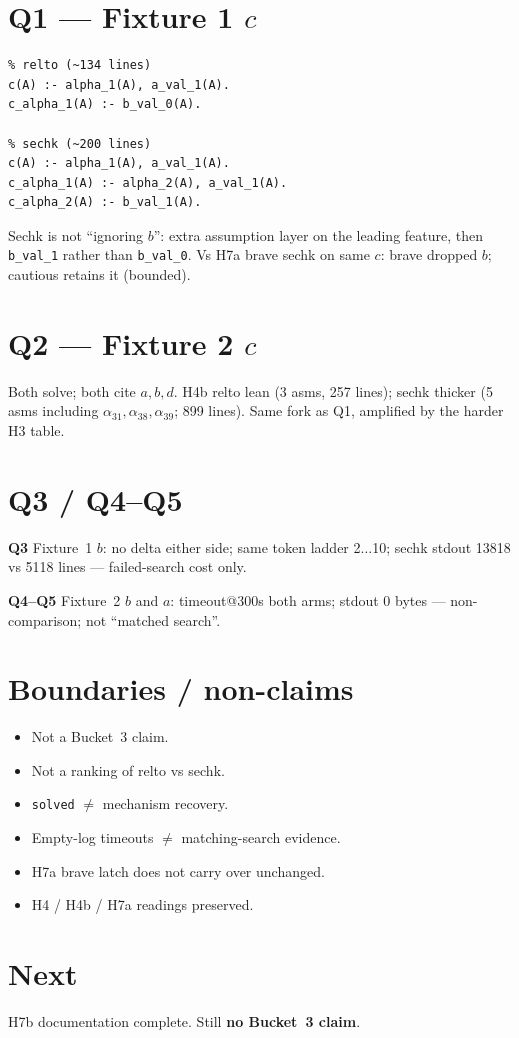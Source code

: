 \documentclass[11pt]{article}
\begin{document}
\section{Q1 --- Fixture 1 $c$}

\begin{verbatim}
% relto (~134 lines)
c(A) :- alpha_1(A), a_val_1(A).
c_alpha_1(A) :- b_val_0(A).

% sechk (~200 lines)
c(A) :- alpha_1(A), a_val_1(A).
c_alpha_1(A) :- alpha_2(A), a_val_1(A).
c_alpha_2(A) :- b_val_1(A).
\end{verbatim}
Sechk is not ``ignoring $b$'': extra assumption layer on the leading feature,
then \texttt{b\_val\_1} rather than \texttt{b\_val\_0}.
Vs H7a brave sechk on same $c$: brave dropped $b$; cautious retains it
(bounded).

\section{Q2 --- Fixture 2 $c$}

Both solve; both cite $a,b,d$.
H4b relto lean (3 asms, 257 lines); sechk thicker (5 asms including
$\alpha_{31},\alpha_{38},\alpha_{39}$; 899 lines).
Same fork as Q1, amplified by the harder H3 table.

\section{Q3 / Q4--Q5}

\textbf{Q3} Fixture~1 $b$: no delta either side; same token ladder 2$\ldots$10;
sechk stdout 13818 vs 5118 lines --- failed-search cost only.

\textbf{Q4--Q5} Fixture~2 $b$ and $a$: timeout@300s both arms; stdout 0 bytes
--- non-comparison; not ``matched search''.

\section{Boundaries / non-claims}

\begin{itemize}
  \item Not a Bucket~3 claim.
  \item Not a ranking of relto vs sechk.
  \item \texttt{solved} $\neq$ mechanism recovery.
  \item Empty-log timeouts $\neq$ matching-search evidence.
  \item H7a brave latch does not carry over unchanged.
  \item H4 / H4b / H7a readings preserved.
\end{itemize}

\section{Next}

H7b documentation complete.
Still \textbf{no Bucket~3 claim}.
\end{document}
